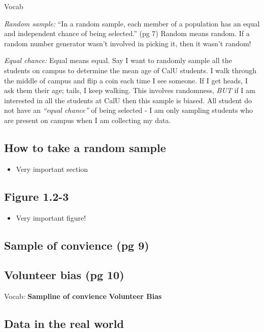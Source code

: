 \documentclass[]{book}
\providecommand{\tightlist}{%
  \setlength{\itemsep}{0pt}\setlength{\parskip}{0pt}}
\theoremstyle{definition}
\theoremstyle{definition}
\theoremstyle{definition}
\theoremstyle{remark}
\begin{document}
Vocab

\emph{Random sample:} ``In a random sample, each member of a population
has an equal and independent chance of being selected.'' (pg 7) Random
means random. If a random number generator wasn't involved in picking
it, then it wasn't random!

\emph{Equal chance:} Equal means equal. Say I want to randomly sample
all the students on campus to determine the mean age of CalU students. I
walk through the middle of campus and flip a coin each time I see
someone. If I get heads, I ask them their age; tails, I keep walking.
This involves randomness, \emph{BUT} if I am interested in all the
students at CalU then this sample is biased. All student do not have an
\emph{``equal chance''} of being selected - I am only sampling students
who are present on campus when I am collecting my data.

\subsection{How to take a random
sample}\label{how-to-take-a-random-sample}

\begin{itemize}
\tightlist
\item
  Very important section
\end{itemize}

\subsection{Figure 1.2-3}\label{figure-1.2-3}

\begin{itemize}
\tightlist
\item
  Very important figure!
\end{itemize}

\subsection{Sample of convience (pg 9)}\label{sample-of-convience-pg-9}

\subsection{Volunteer bias (pg 10)}\label{volunteer-bias-pg-10}

Vocab: \textbf{Sampline of convience} \textbf{Volunteer Bias}

\subsection{Data in the real world}\label{data-in-the-real-world}
\end{document}
